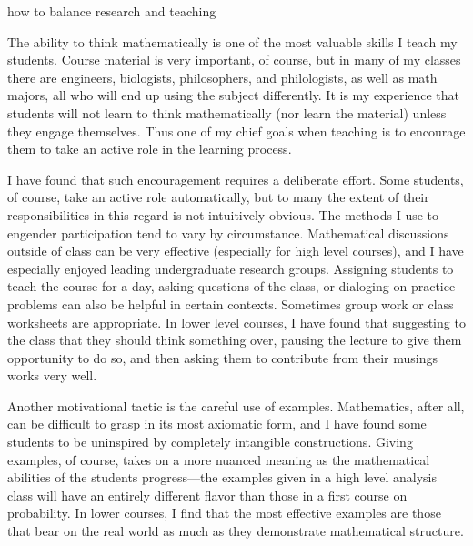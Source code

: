 \documentclass[12pt]{amsart} \usepackage{amssymb}
\begin{document}
how to balance research and teaching

The ability to think mathematically is one of the most valuable skills
I teach my students.  Course material is very important, of course,
but in many of my classes there are engineers, biologists,
philosophers, and philologists, as well as math majors, all who will
end up using the subject differently.  It is my experience that
students will not learn to think mathematically (nor learn the
material) unless they engage themselves. Thus one of my chief goals
when teaching is to encourage them to take an active role in the
learning process.

I have found that such encouragement requires a deliberate effort.
Some students, of course, take an active role automatically, but to
many the extent of their responsibilities in this regard is not
intuitively obvious. The methods I use to engender participation tend
to vary by circumstance.  Mathematical discussions
outside of class can be very effective (especially for high level
courses), and I have especially enjoyed leading undergraduate research
groups.  Assigning students to teach the course for a day, asking
questions of the class, or dialoging on practice problems can also be
helpful in certain contexts.  Sometimes group work or class worksheets
are appropriate.  In lower level courses, I have found that suggesting
to the class that they should think something over, pausing the
lecture to give them opportunity to do so, and then asking them to
contribute from their musings works very well.

Another motivational tactic is the careful use of examples.
Mathematics, after all, can be difficult to grasp in its most
axiomatic form, and I have found some students to be uninspired by
completely intangible constructions. Giving examples, of course, takes
on a more nuanced meaning as the mathematical abilities of the
students progress---the examples given in a high level analysis class
will have an entirely different flavor than those in a first course on
probability. In lower courses, I find that the most effective examples
are those that bear on the real world as much as they demonstrate
mathematical structure.
\end{document}
